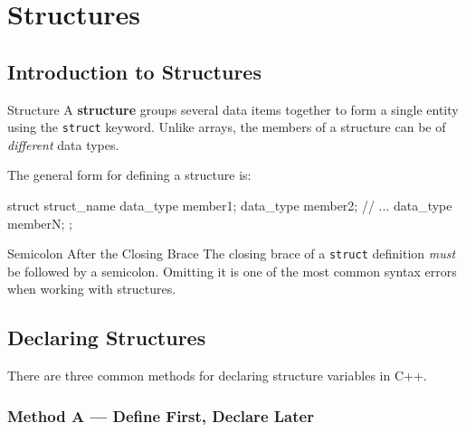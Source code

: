 \chapter{Structures}
\label{ch:structures}

\section{Introduction to Structures}
\label{sec:struct-intro}

\begin{definitionbox}{Structure}
A \textbf{structure} groups several data items together to form a
single entity using the \texttt{struct} keyword.  Unlike arrays, the
members of a structure can be of \emph{different} data types.
\end{definitionbox}

\noindent
The general form for defining a structure is:

\begin{cppcode}
struct struct_name {
    data_type member1;
    data_type member2;
    // ...
    data_type memberN;
};
\end{cppcode}

\begin{importantbox}{Semicolon After the Closing Brace}
The closing brace of a \texttt{struct} definition \emph{must} be
followed by a semicolon.  Omitting it is one of the most common
syntax errors when working with structures.
\end{importantbox}

\section{Declaring Structures}
\label{sec:struct-declaring}

There are three common methods for declaring structure variables in C++.

\subsection{Method A --- Define First, Declare Later}

